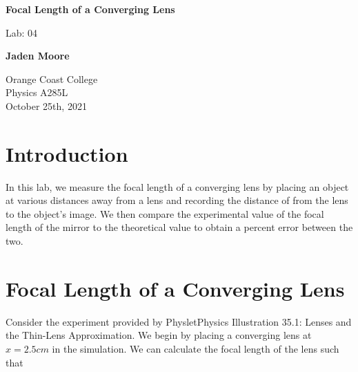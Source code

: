 \documentclass[12pt]{article}
\begin{document}

\begin{filecontents}{data1.csv}
    X	      Y
    0.74	1.54
    0.82	1.28
    0.94	1.06
    1.14	0.89
    1.24	0.83
    1.38	0.78
    1.58	0.73
    1.83	0.68
    2.1 	0.65
    2.3 	0.63
    };
\end{filecontents}

\begin{titlepage}
    \begin{center}
        \vspace*{1cm}
        \textbf{Focal Length of a Converging Lens}

        \vspace{0.5cm}
        Lab: 04

        \vspace{1cm}

        \textbf{Jaden Moore}

        \vfill

        Orange Coast College\\
        Physics A285L\\
        October 25th, 2021

    \end{center}
\end{titlepage}

\pagestyle{fancy}
\fancyhf{}
\setlength{\headheight}{15pt}
\cfoot{\thepage}

\section{Introduction}
In this lab, we measure the focal length of a converging lens by placing an object at various distances away from a lens and recording the distance of from the lens to the object's image. We then compare the experimental value of the focal length of the mirror to the theoretical value to obtain a percent error between the two.

\section{Focal Length of a Converging Lens}
Consider the experiment provided by Physlet\textregistered \space Physics Illustration 35.1: Lenses and the Thin-Lens Approximation. We begin by placing a converging lens at $x=2.5cm$ in the simulation. We can calculate the focal length of the lens such that
\end{document}
